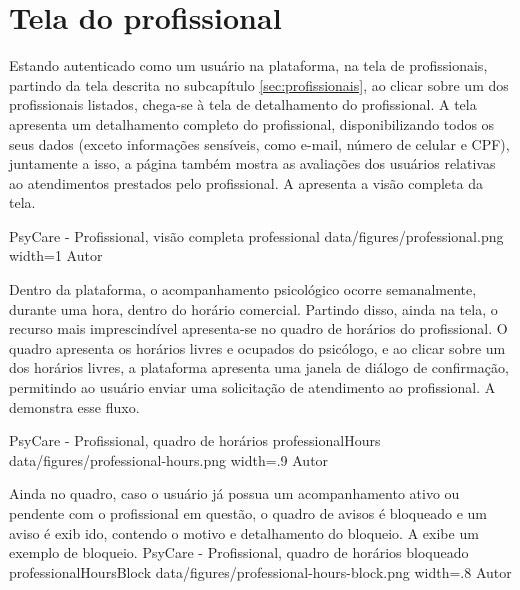 \section{Tela do profissional}
\label{sec:profissional}

Estando autenticado como um usuário na plataforma, na tela de profissionais, partindo da tela descrita no subcapítulo \ref{sec:profissionais}, ao clicar sobre um dos profissionais listados, chega-se à tela de detalhamento do profissional. A tela apresenta um detalhamento completo do profissional, disponibilizando todos os seus dados (exceto informações sensíveis, como e-mail, número de celular e CPF), juntamente a isso, a página também mostra as avaliações dos usuários relativas ao atendimentos prestados pelo profissional. A  apresenta a visão completa da tela.

\image
    {PsyCare - Profissional, visão completa}
    {professional}
    {data/figures/professional.png}
    {width=1\textwidth}
    {Autor}

Dentro da plataforma, o acompanhamento psicológico ocorre semanalmente, durante uma hora, dentro do horário comercial. Partindo disso, ainda na tela, o recurso mais imprescindível apresenta-se no quadro de horários do profissional. O quadro apresenta os horários livres e ocupados do psicólogo, e ao clicar sobre um dos horários livres, a plataforma apresenta uma janela de diálogo de confirmação, permitindo ao usuário enviar uma solicitação de atendimento ao profissional. A  demonstra esse fluxo.

\image
    {PsyCare - Profissional, quadro de horários}
    {professionalHours}
    {data/figures/professional-hours.png}
    {width=.9\textwidth}
    {Autor}

Ainda no quadro, caso o usuário já possua um acompanhamento ativo ou pendente com o profissional em questão, o quadro de avisos é bloqueado e um aviso é exib ido, contendo o motivo e detalhamento do bloqueio. A  exibe um exemplo de bloqueio.
\image
    {PsyCare - Profissional, quadro de horários bloqueado}
    {professionalHoursBlock}
    {data/figures/professional-hours-block.png}
    {width=.8\textwidth}
    {Autor}